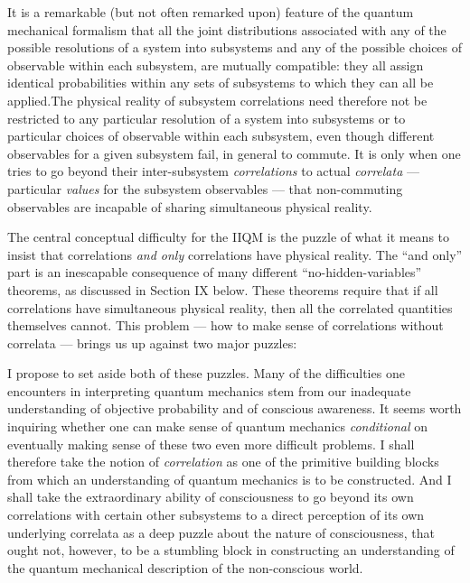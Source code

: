 It is a remarkable (but not often remarked upon) feature of the
quantum mechanical formalism that all the joint distributions
associated with any of the possible resolutions of a system into
subsystems and any of the possible choices of observable within each
subsystem, are mutually compatible: they all assign identical
probabilities within any sets of subsystems to which they can all be
applied.\fn The physical reality of subsystem correlations need
therefore not be restricted to any particular resolution of a system
into subsystems or to particular choices of observable within each
subsystem, even though different observables for a given subsystem
fail, in general to commute.  It is only when one tries to go beyond
their inter-subsystem {\it correlations\/} to actual {\it correlata\/}
--- particular {\it values\/} for the subsystem observables --- that
non-commuting observables are incapable of sharing simultaneous
physical reality.\fn

The central conceptual difficulty for the IIQM is
the puzzle of what it means to insist that correlations {\it and
only\/} correlations have physical reality.  The ``and only'' part is
an inescapable consequence of many different ``no-hidden-variables''
theorems, as discussed in Section IX below.  These theorems require
that if all correlations have simultaneous physical reality, then all
the correlated quantities themselves cannot.  This problem --- how to
make sense of correlations without correlata --- brings us up against
two major puzzles: 

\medskip



\noindent
I propose to set aside both of these puzzles.  Many of the
difficulties one encounters in interpreting quantum mechanics stem
from our inadequate understanding of objective probability and of
conscious awareness.  It seems worth inquiring whether one can make
sense of quantum mechanics {\it conditional\/} on eventually making
sense of these two even more difficult problems.  I shall therefore
take the notion of {\it correlation\/} as one of the primitive
building blocks from which an understanding of quantum mechanics is to
be constructed.  And I shall take the extraordinary ability of
consciousness to go beyond its own correlations with certain other
subsystems to a direct perception of its own underlying correlata as a
deep puzzle about the nature of consciousness, that ought not,
however, to be a stumbling block in constructing an understanding of
the quantum mechanical description of the non-conscious world.

